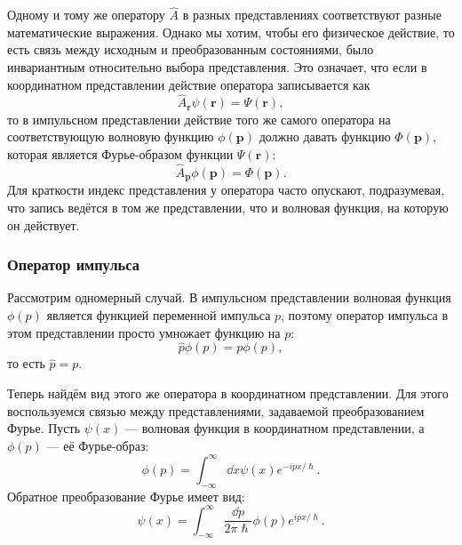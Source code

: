 \documentclass[a4paper, 12pt]{article}
\begin{document}
Одному и тому же оператору $\hat{A}$ в разных представлениях соответствуют разные математические выражения. Однако мы хотим, чтобы его физическое действие, то есть связь между исходным и преобразованным состояниями, было инвариантным относительно выбора представления. Это означает, что если в координатном представлении действие оператора записывается как
\begin{equation}
    \hat{A}_{\bm{r}} \psi(\bm{r}) = \Psi(\bm{r}),
\end{equation}
то в импульсном представлении действие того же самого оператора на соответствующую волновую функцию $\phi(\bm{p})$ должно давать функцию $\Phi(\bm{p})$, которая является Фурье-образом функции $\Psi(\bm{r})$:
\begin{equation}
    \hat{A}_{\bm{p}} \phi(\bm{p}) = \Phi(\bm{p}).
\end{equation}
Для краткости индекс представления у оператора часто опускают, подразумевая, что запись ведётся в том же представлении, что и волновая функция, на которую он действует.

\subsubsection*{Оператор импульса}

Рассмотрим одномерный случай. В импульсном представлении волновая функция $\phi(p)$ является функцией переменной импульса $p$, поэтому оператор импульса в этом представлении просто умножает функцию на $p$:
\begin{equation}
    \hat{p} \phi(p) = p \phi(p), \label{eq:p_in_p_rep}
\end{equation}
то есть $\hat{p} = p$.

Теперь найдём вид этого же оператора в координатном представлении. Для этого воспользуемся связью между представлениями, задаваемой преобразованием Фурье. Пусть $\psi(x)$ --- волновая функция в координатном представлении, а $\phi(p)$ --- её Фурье-образ:
\begin{equation}
    \phi(p) = \int_{-\infty}^{\infty} \dd{x} \psi(x) e^{-i p x / \hslash}.
\end{equation}
Обратное преобразование Фурье имеет вид:
\begin{equation}
    \psi(x) = \int_{-\infty}^{\infty} \frac{\dd{p}}{2\pi\hslash} \phi(p) e^{i p x / \hslash}.
\end{equation}
\end{document}
